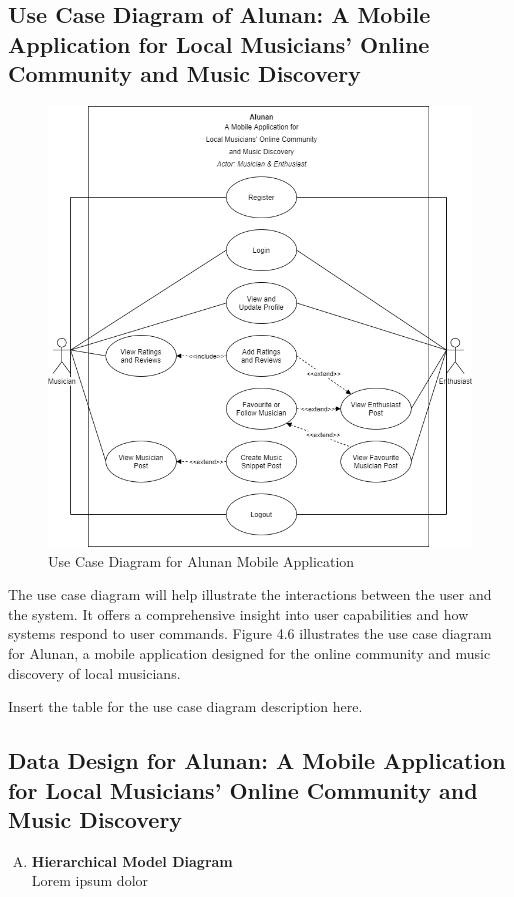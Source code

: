 \subsection{Use Case Diagram of Alunan: A Mobile Application for Local Musicians’ Online Community and Music Discovery}
\begin{figure}[h]
    \centering
    \includegraphics[width=1.0\linewidth]{mainmatter/images/usecasemain.png}
    \caption{Use Case Diagram for Alunan Mobile Application}
    \label{fig:myfig45}
\end{figure}
The use case diagram will help illustrate the interactions between the user and the system. It offers a comprehensive insight into user capabilities and how systems respond to user commands. Figure 4.6 illustrates the use case diagram for Alunan, a mobile application designed for the online community and music discovery of local musicians.
\pagebreak

Insert the table for the use case diagram description here.

\subsection{Data Design for Alunan: A Mobile Application for Local Musicians’ Online Community and Music Discovery}
\begin{enumerate}[A.]
    \item \textbf{Hierarchical Model Diagram} \\
    Lorem ipsum dolor
\end{enumerate}

